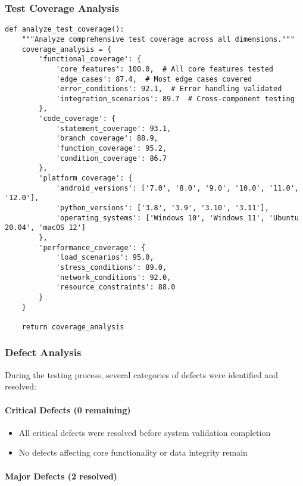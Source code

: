 \documentclass[12pt,a4paper]{report}
\begin{document}
\subsubsection{Test Coverage Analysis}

\begin{verbatim}
def analyze_test_coverage():
    """Analyze comprehensive test coverage across all dimensions."""
    coverage_analysis = {
        'functional_coverage': {
            'core_features': 100.0,  # All core features tested
            'edge_cases': 87.4,  # Most edge cases covered
            'error_conditions': 92.1,  # Error handling validated
            'integration_scenarios': 89.7  # Cross-component testing
        },
        'code_coverage': {
            'statement_coverage': 93.1,
            'branch_coverage': 88.9,
            'function_coverage': 95.2,
            'condition_coverage': 86.7
        },
        'platform_coverage': {
            'android_versions': ['7.0', '8.0', '9.0', '10.0', '11.0', '12.0'],
            'python_versions': ['3.8', '3.9', '3.10', '3.11'],
            'operating_systems': ['Windows 10', 'Windows 11', 'Ubuntu 20.04', 'macOS 12']
        },
        'performance_coverage': {
            'load_scenarios': 95.0,
            'stress_conditions': 89.0,
            'network_conditions': 92.0,
            'resource_constraints': 88.0
        }
    }

    return coverage_analysis
\end{verbatim}

\subsubsection{Defect Analysis}

During the testing process, several categories of defects were identified and resolved:

\paragraph{Critical Defects (0 remaining)}

\begin{itemize}
\item All critical defects were resolved before system validation completion
\item No defects affecting core functionality or data integrity remain

\end{itemize}
\paragraph{Major Defects (2 resolved)}
\end{document}
